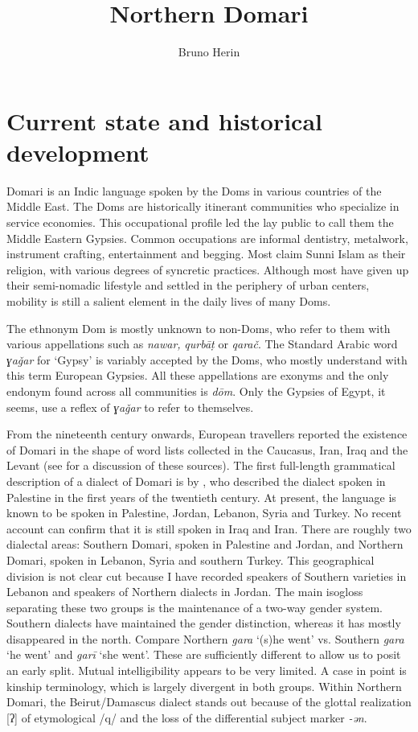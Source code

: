 \documentclass[output=paper]{langsci/langscibook}
\author{Bruno Herin\affiliation{Inalco, IUF}}
\title{Northern Domari}
\begin{document}
\maketitle
 
\section{Current state and historical development}

Domari is an Indic language spoken by the Doms in various countries of the Middle East. The Doms are historically itinerant communities who specialize in service economies. This occupational profile led the lay public to call them the Middle Eastern Gypsies. Common occupations are informal dentistry, metalwork, instrument crafting, entertainment and begging. Most claim Sunni Islam as their religion, with various degrees of syncretic practices. Although most have given up their semi-nomadic lifestyle and settled in the periphery of urban centers, mobility is still a salient element in the daily lives of many Doms.

The ethnonym Dom is mostly unknown to non-Doms, who refer to them with various appellations such as \textit{nawar,} \textit{qurbāṭ} or \textit{qarač}. The Standard Arabic word \textit{ɣa\v{g}ar} for `Gypsy' is variably accepted by the Doms, who mostly understand with this term European Gypsies. All these appellations are exonyms and the only endonym found across all communities is \textit{dōm}. Only the Gypsies of Egypt, it seems, use a reflex of \textit{ɣa\v{g}ar} to refer to themselves. 

From the nineteenth century onwards, European travellers reported the existence of Domari in the shape of word lists collected in the Caucasus, Iran, Iraq and the Levant (see \citealt{Herin2012} for a discussion of these sources). The first full-length grammatical description of a dialect of Domari is by \citet{Macalister1914}, who described the dialect spoken in Palestine in the first years of the twentieth century. At present, the language is known to be spoken in Palestine, Jordan, Lebanon, Syria and Turkey. No recent account can confirm that it is still spoken in Iraq and Iran. There are roughly two dialectal areas:  Southern Domari, spoken in Palestine and Jordan, and Northern Domari, spoken in Lebanon, Syria and southern Turkey. This geographical division is not clear cut because I have recorded speakers of Southern varieties in Lebanon and speakers of Northern dialects in Jordan. The main isogloss separating these two groups is the maintenance of a two-way gender system. Southern dialects have maintained the gender distinction, whereas it has mostly disappeared in the north. Compare Northern \textit{gara} ‘(s)he went’ vs. Southern \textit{gara} ‘he went’ and \textit{garī} ‘she went’. These are sufficiently different to allow us to posit an early split. Mutual intelligibility appears to be very limited. A case in point is kinship terminology, which is largely divergent in both groups. Within Northern Domari, the Beirut/Damascus dialect stands out because of the glottal realization [ʔ] of etymological /q/ and the loss of the differential subject marker \textit{-ən}. 
\end{document}
